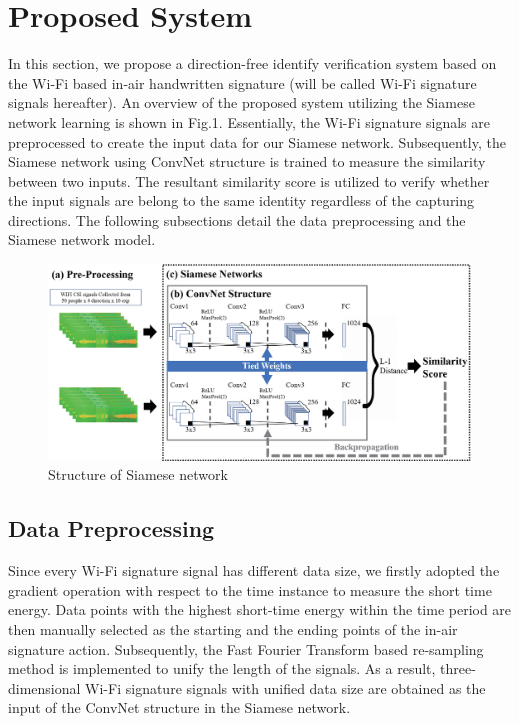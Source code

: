 \documentclass[runningheads]{llncs}
\begin{document}
\section{Proposed System}

In this section, we propose a direction-free identify verification system based on the Wi-Fi based in-air handwritten signature (will be called Wi-Fi signature signals hereafter). An overview of the proposed system utilizing the Siamese network learning is shown in Fig.1.
Essentially, the Wi-Fi signature signals are preprocessed to create the input data for our Siamese network. Subsequently, the Siamese network using ConvNet structure is trained to measure the similarity between two inputs. The resultant similarity score is utilized to verify whether the input signals are belong to the same identity regardless of the capturing directions. The following subsections detail the
data preprocessing and the Siamese network model.

\begin{figure}
    \includegraphics[width=\textwidth]{network3.eps}
    \caption{Structure of Siamese network} \label{fig1}
\end{figure}

\subsection{Data Preprocessing}

Since every Wi-Fi signature signal has different data size, we firstly adopted the gradient operation with respect to the time instance to measure the short time energy. Data points with the highest short-time energy within the time period are then manually selected as the starting and the ending points of the in-air signature action. Subsequently, the Fast Fourier Transform based re-sampling method \cite{moon2017air} is implemented to unify the length of the signals. As a result, three-dimensional Wi-Fi signature signals with unified data size are obtained as the input of the ConvNet structure in the Siamese network.
\end{document}
